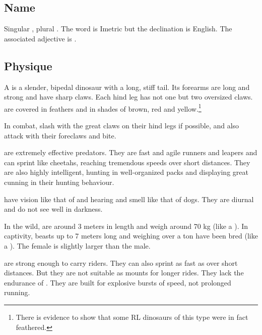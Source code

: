 \subsection{Name}
Singular \emph{\nycan{}}, plural \emph{\nycans{}}. 
The word is Imetric but the declination is English. 
The associated adjective is \emph{\nycan{}}. 









\subsection{Physique}
A \nycan{} is a slender, bipedal dinosaur with a long, stiff tail. Its forearms are long and strong and have sharp claws. Each hind leg has not one but two oversized claws. \Nycans{} are covered in feathers and \coloured in shades of brown, red and yellow.\footnote{There is evidence to show that some RL dinosaurs of this type were in fact feathered.} 

In combat, \nycans{} slash with the great claws on their hind legs if possible, and also attack with their foreclaws and bite. 

\Nycans{} are extremely effective predators. They are fast and agile runners and leapers and can sprint like cheetahs, reaching tremendous speeds over short distances. They are also highly intelligent, hunting in well-organized packs and displaying great cunning in their hunting behaviour. 

\Nycans{} have vision like that of \humans{} and hearing and smell like that of dogs. They are diurnal and do not see well in darkness. 

In the wild, \nycans{} are around 3 meters in length and weigh around 70 kg (like a ). 
In captivity, beasts up to 7 meters long and weighing over a ton have been bred (like a ). 
The female is slightly larger than the male. 

\Nycans{} are strong enough to carry riders. 
They can also sprint as fast as  over short distances. 
But they are not suitable as mounts for longer rides. 
They lack the endurance of \relcs. 
They are built for explosive bursts of speed, not prolonged running. 






